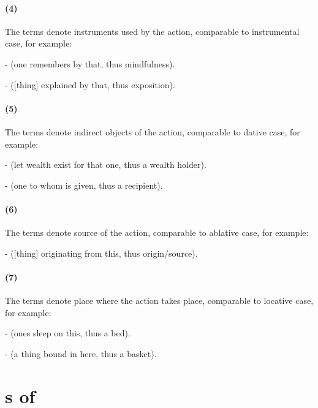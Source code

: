 \paragraph*{(4) } The terms denote instruments used by the action, comparable to instrumental case, for example:\par
-  (one remembers by that, thus mindfulness).\par
-  ([thing] explained by that, thus exposition).\par

\paragraph*{(5) } The terms denote indirect objects of the action, comparable to dative case, for example:\par
-  (let wealth exist for that one, thus a wealth holder).\par
-  (one to whom is given, thus a recipient).\par

\paragraph*{(6) } The terms denote source of the action, comparable to ablative case, for example:\par
-  ([thing] originating from this, thus origin/source).\par

\paragraph*{(7) } The terms denote place where the action takes place, comparable to locative case, for example:\par
-  (ones sleep on this, thus a bed).\par
-  (a thing bound in here, thus a basket).\par

\section*{s of }

